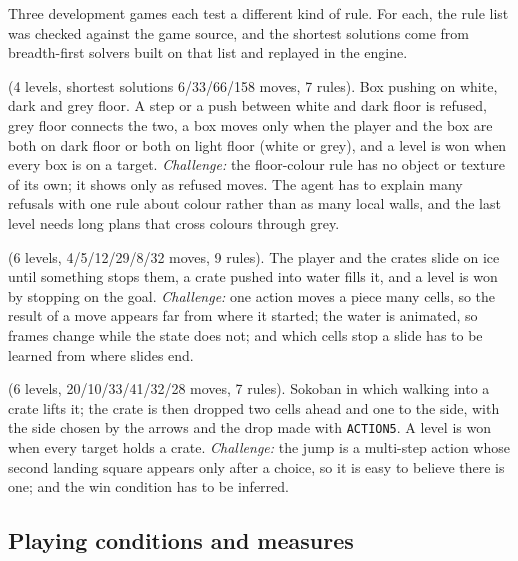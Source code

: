 \documentclass[11pt,a4paper]{article}
\begin{document}
Three development games each test a different kind of rule. For each, the
rule list was checked against the game source, and the shortest solutions
come from breadth-first solvers built on that list and replayed in the
engine.
\begin{description}[leftmargin=1.2em,itemsep=2pt]
  \item[Modality] (4 levels, shortest solutions 6/33/66/158 moves, 7 rules).
  Box pushing on white, dark and grey floor. A step or a push between white
  and dark floor is refused, grey floor connects the two, a box moves only
  when the player and the box are both on dark floor or both on light floor
  (white or grey), and a level is won when every box is on a target.
  \emph{Challenge:} the floor-colour rule has no object or texture of its
  own; it shows only as refused moves. The agent has to explain many
  refusals with one rule about colour rather than as many local walls, and
  the last level needs long plans that cross colours through grey.
  \item[IceCrates] (6 levels, 4/5/12/29/8/32 moves, 9 rules). The player and
  the crates slide on ice until something stops them, a crate pushed into
  water fills it, and a level is won by stopping on the goal.
  \emph{Challenge:} one action moves a piece many cells, so the result of a
  move appears far from where it started; the water is animated, so frames
  change while the state does not; and which cells stop a slide has to be
  learned from where slides end.
  \item[Knightoban] (6 levels, 20/10/33/41/32/28 moves, 7 rules). Sokoban in
  which walking into a crate lifts it; the crate is then dropped two cells
  ahead and one to the side, with the side chosen by the arrows and the drop
  made with \texttt{ACTION5}. A level is won when every target holds a crate.
  \emph{Challenge:} the jump is a multi-step action whose second landing
  square appears only after a choice, so it is easy to believe there is one;
  and the win condition has to be inferred.
\end{description}

\subsection{Playing conditions and measures}
\label{sec:conditions}
\end{document}
